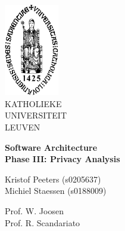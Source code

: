\thispagestyle{empty}
\begin{flushleft}
\includegraphics[height=40mm]{figs/sedes_2.jpg}\\
\small
KATHOLIEKE\\ UNIVERSITEIT\\ LEUVEN
\end{flushleft}


\begin{center}
\textbf{Software Architecture} \\
\LARGE
\textbf{Phase III: Privacy Analysis}
\end{center}


\begin{flushleft}
\small
Kristof Peeters (s0205637)\\
Michiel Staessen (s0188009)
\end{flushleft}

\begin{flushleft}
Prof. W. Joosen \\
Prof. R. Scandariato
\end{flushleft}

